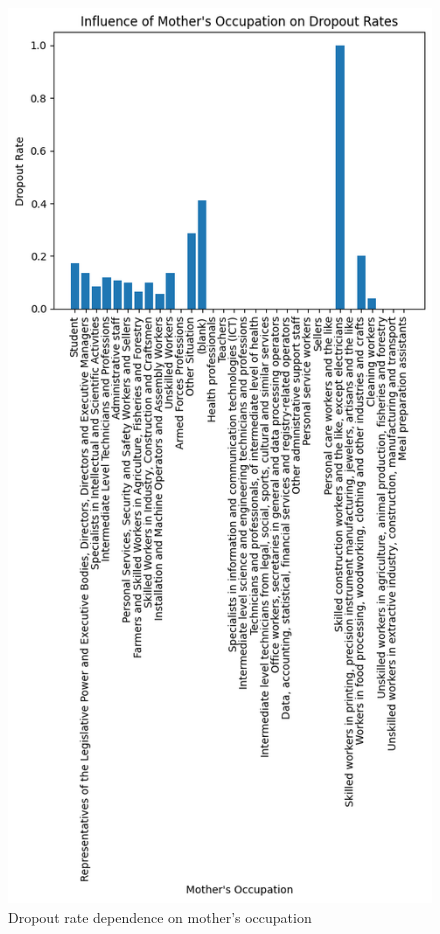 \documentclass[
  letterpaper,
  DIV=11,
  numbers=noendperiod]{scrartcl}
\begin{document}
\begin{figure}

{\centering \includegraphics{report_AzadhdhinNedalYunisAlFraijat_files/figure-pdf/fig-mother-occupation-output-1.png}

}

\caption{\label{fig-mother-occupation}Dropout rate dependence on
mother's occupation}

\end{figure}
\end{document}
